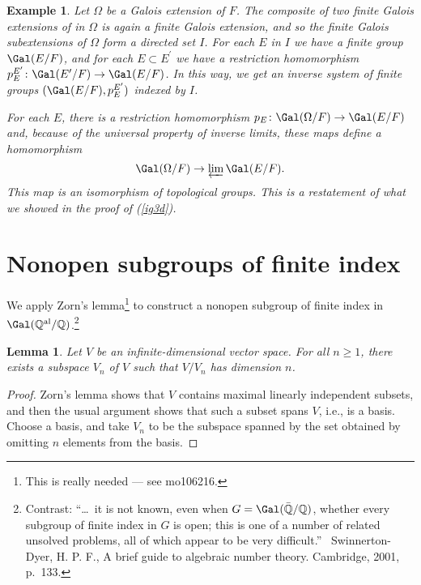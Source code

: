 \documentclass[a4paper,11pt,final,openany]{memoir}
\newtheorem{lemma}[X]{Lemma}
\newtheorem{example}[X]{Example}
\theoremstyle{nonumberplain}
\newtheorem{proof}{Proof.}
\begin{document}
\begin{example}
\label{ig16a}Let $\Omega$ be a Galois extension of $F$. The composite of two
finite Galois extensions of in $\Omega$ is again a finite Galois extension,
and so the finite Galois subextensions of $\Omega$ form a directed set $I$.
For each $E$ in $I$ we have a finite group $\Gal(E/F)$, and for each $E\subset
E^{\prime}$ we have a restriction homomorphism $p_{E}^{E^{\prime}}%
\colon\Gal(E^{\prime}/F)\rightarrow\Gal(E/F)$. In this way, we get an inverse
system of finite groups $(\Gal(E/F),p_{E}^{E^{\prime}})$ indexed by $I$.

For each $E$, there is a restriction homomorphism $p_{E}\colon\Gal(\Omega
/F)\rightarrow\Gal(E/F)$ and, because of the universal property of inverse
limits, these maps define a homomorphism%
\[
\Gal(\Omega/F)\rightarrow\varprojlim\Gal(E/F)\text{.}%
\]
This map is an isomorphism of topological groups. This is a restatement of
what we showed in the proof of (\ref{ig3d}).
\end{example}

\section{Nonopen subgroups of finite index}

We apply Zorn's lemma\footnote{This is really needed --- see mo106216.} to
construct a nonopen subgroup of finite index in $\Gal(\mathbb{Q}^{\mathrm{al}%
}/\mathbb{Q})$.\footnote{Contrast: \textquotedblleft\ldots\ it is not known,
even when $G=\Gal(\mathbb{\bar{Q}}/\mathbb{Q}{})$, whether every subgroup of
finite index in $G{}$ is open; this is one of a number of related unsolved
problems, all of which appear to be very difficult.\textquotedblright%
\ \noindent Swinnerton-Dyer, H. P. F., A brief guide to algebraic number
theory. Cambridge, 2001, p.\ 133.}

\begin{lemma}
\label{ig18}Let $V$ be an infinite-dimensional vector space. For all $n\geq1$,
there exists a subspace $V_{n}$ of $V$ such that $V/V_{n}$ has dimension $n$.
\end{lemma}

\begin{proof}
Zorn's lemma shows that $V$ contains maximal linearly independent subsets, and
then the usual argument shows that such a subset spans $V$, i.e., is a basis.
Choose a basis, and take $V_{n}$ to be the subspace spanned by the set
obtained by omitting $n$ elements from the basis.
\end{proof}
\end{document}
